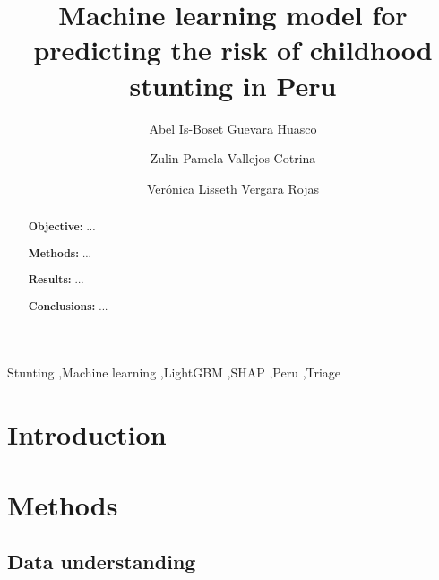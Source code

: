 \documentclass[preprint,12pt]{elsarticle}   %
\begin{document}
\begin{frontmatter}

\title{Machine learning model for predicting the risk of childhood stunting in Peru}

\author[upeu]{Abel Is-Boset Guevara Huasco}
\author[upeu]{Zulin Pamela Vallejos Cotrina}
\author[upeu]{Ver\'onica Lisseth Vergara Rojas}


\begin{abstract}
\noindent\textbf{Objective:} ...

\noindent\textbf{Methods:} ...

\noindent\textbf{Results:} ...

\noindent\textbf{Conclusions:} ...
\end{abstract}

\begin{keyword}
Stunting \sep Machine learning \sep LightGBM \sep SHAP \sep Peru \sep Triage
\end{keyword}

\end{frontmatter}


\section{Introduction}

\section{Methods}
\subsection{Data understanding}
\end{document}
